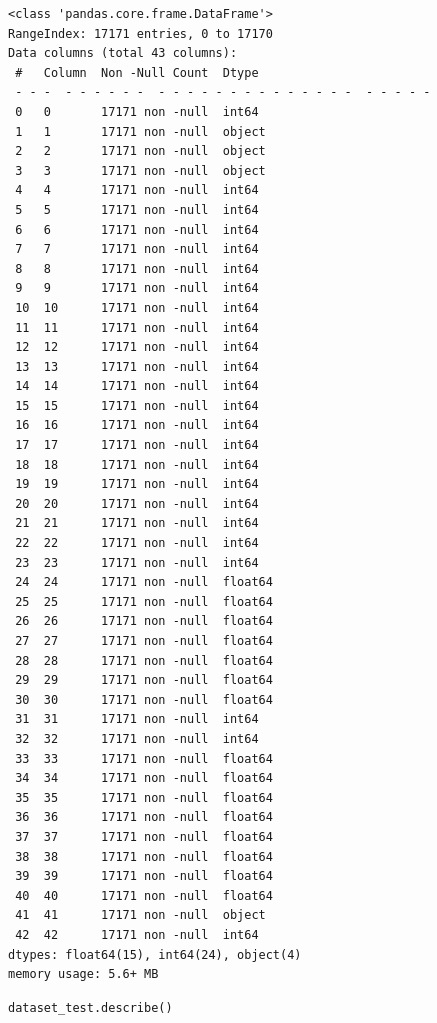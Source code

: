 \begin{verbatim}
<class 'pandas.core.frame.DataFrame'>
RangeIndex: 17171 entries, 0 to 17170
Data columns (total 43 columns):
 #   Column  Non -Null Count  Dtype  
 - - -  - - - - - -  - - - - - - - - - - - - - -  - - - - -  
 0   0       17171 non -null  int64  
 1   1       17171 non -null  object 
 2   2       17171 non -null  object 
 3   3       17171 non -null  object 
 4   4       17171 non -null  int64  
 5   5       17171 non -null  int64  
 6   6       17171 non -null  int64  
 7   7       17171 non -null  int64  
 8   8       17171 non -null  int64  
 9   9       17171 non -null  int64  
 10  10      17171 non -null  int64  
 11  11      17171 non -null  int64  
 12  12      17171 non -null  int64  
 13  13      17171 non -null  int64  
 14  14      17171 non -null  int64  
 15  15      17171 non -null  int64  
 16  16      17171 non -null  int64  
 17  17      17171 non -null  int64  
 18  18      17171 non -null  int64  
 19  19      17171 non -null  int64  
 20  20      17171 non -null  int64  
 21  21      17171 non -null  int64  
 22  22      17171 non -null  int64  
 23  23      17171 non -null  int64  
 24  24      17171 non -null  float64
 25  25      17171 non -null  float64
 26  26      17171 non -null  float64
 27  27      17171 non -null  float64
 28  28      17171 non -null  float64
 29  29      17171 non -null  float64
 30  30      17171 non -null  float64
 31  31      17171 non -null  int64  
 32  32      17171 non -null  int64  
 33  33      17171 non -null  float64
 34  34      17171 non -null  float64
 35  35      17171 non -null  float64
 36  36      17171 non -null  float64
 37  37      17171 non -null  float64
 38  38      17171 non -null  float64
 39  39      17171 non -null  float64
 40  40      17171 non -null  float64
 41  41      17171 non -null  object 
 42  42      17171 non -null  int64  
dtypes: float64(15), int64(24), object(4)
memory usage: 5.6+ MB
\end{verbatim}

\begin{verbatim}
dataset_test.describe()
\end{verbatim}

